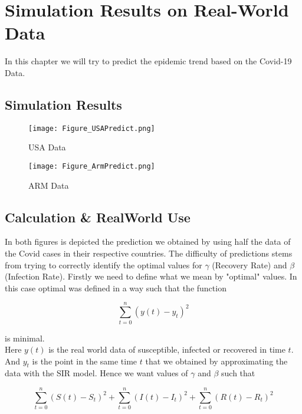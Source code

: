\section{Simulation Results on Real-World Data}\label{Real_world}\thispagestyle{SectionFirstPage} %
In this chapter we will try to predict the epidemic trend based on the Covid-19 Data.

\subsection{Simulation Results}\label{figures}
\begin{figure}[H]
	\caption{USA Data}
	\centering
	\texttt{[image: Figure\_USAPredict.png]}
\end{figure}
\begin{figure}[H]
	\caption{ARM Data}
	\centering
	\texttt{[image: Figure\_ArmPredict.png]}
\end{figure}

\pagebreak

\subsection{Calculation \& RealWorld Use}\label{Applicaltions}
In both figures is depicted the prediction we obtained by using half the data 
of the Covid cases in their respective countries. The difficulty of predictions stems from
trying to correctly identify the optimal values for $\gamma$ (Recovery Rate) and $\beta$ (Infection Rate). Firstly we need to define what we mean
by "optimal" values. In this case optimal was defined in a way such that the function

\begin{equation*}
	\sum_{t=0}^{n} (y(t)-y_t)^2 
\end{equation*}

is minimal. \\

Here $y(t)$ is the real world data of susceptible, infected or recovered in time $t$.
And $y_t$ is the point in the same time $t$ that we obtained by approximating the data with the SIR model.
Hence we want values of $\gamma$ and $\beta$ such that

\begin{equation*}
	\sum_{t=0}^{n} (S(t)-S_t)^2 + \sum_{t=0}^{n} (I(t)-I_t)^2 + \sum_{t=0}^{n} (R(t)-R_t)^2
\end{equation*}

